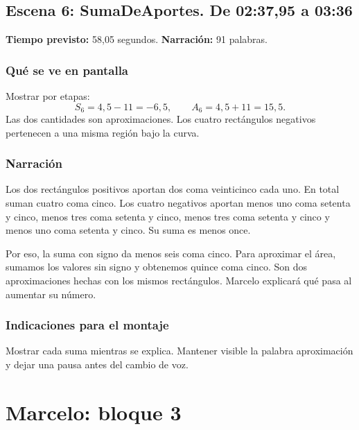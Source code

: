 \documentclass[11pt,a4paper]{article}
\newcommand{\escena}[4]{\textbf{Escena #1: #2.} De #3 a #4}
\begin{document}
\noindent\begin{minipage}[t]{\textwidth}
\subsection*{\escena{6}{SumaDeAportes}{02:37,95}{03:36}}

\textbf{Tiempo previsto:} 58,05 segundos. \textbf{Narración:} 91 palabras.

\subsubsection*{Qué se ve en pantalla}
Mostrar por etapas:
\[
 S_6=4{,}5-11=-6{,}5,\qquad
 A_6=4{,}5+11=15{,}5.
\]
Las dos cantidades son aproximaciones. Los cuatro rectángulos negativos pertenecen a una misma región bajo la curva.

\subsubsection*{Narración}
Los dos rectángulos positivos aportan dos coma veinticinco cada uno. En total suman cuatro coma cinco. Los cuatro negativos aportan menos uno coma setenta y cinco, menos tres coma setenta y cinco, menos tres coma setenta y cinco y menos uno coma setenta y cinco. Su suma es menos once.

Por eso, la suma con signo da menos seis coma cinco. Para aproximar el área, sumamos los valores sin signo y obtenemos quince coma cinco. Son dos aproximaciones hechas con los mismos rectángulos. Marcelo explicará qué pasa al aumentar su número.

\subsubsection*{Indicaciones para el montaje}
Mostrar cada suma mientras se explica. Mantener visible la palabra aproximación y dejar una pausa antes del cambio de voz.
\end{minipage}\par\medskip

\clearpage
\section*{Marcelo: bloque 3}
\end{document}
